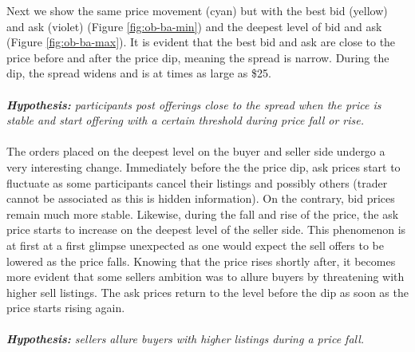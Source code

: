 Next we show the same price movement (cyan) but with the best bid (yellow) and ask (violet) (Figure \ref{fig:ob-ba-min}) and the deepest level of bid and ask (Figure \ref{fig:ob-ba-max}).
It is evident that the best bid and ask are close to the price before and after the price dip, meaning the spread is narrow.
During the dip, the spread widens and is at times as large as \$25.
\\
\\
\textit{\textbf{Hypothesis:} participants post offerings close to the spread when the price is stable and start offering with a certain threshold during price fall or rise.}
\\
\\
The orders placed on the deepest level on the buyer and seller side undergo a very interesting change.
Immediately before the the price dip, ask prices start to fluctuate as some participants cancel their listings and possibly others (trader cannot be associated as this is hidden information).
On the contrary, bid prices remain much more stable.
Likewise, during the fall and rise of the price, the ask price starts to increase on the deepest level of the seller side. 
This phenomenon is at first at a first glimpse unexpected as one would expect the sell offers to be lowered as the price falls.
Knowing that the price rises shortly after, it becomes more evident that some sellers ambition was to allure buyers by threatening with higher sell listings.
The ask prices return to the level before the dip as soon as the price starts rising again.
\\
\\
\textit{\textbf{Hypothesis:} sellers allure buyers with higher listings during a price fall.}
%
